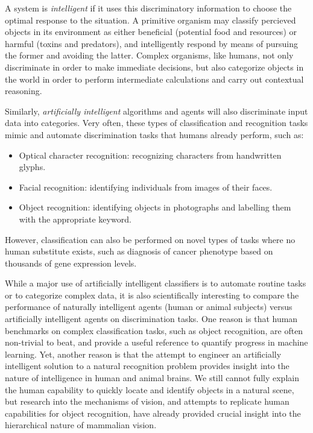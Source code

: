 A system is \emph{intelligent} if it uses this discriminatory
information to choose the optimal response to the situation.  A
primitive organism may classify percieved objects in its environment
as either beneficial (potential food and resources) or harmful (toxins
and predators), and intelligently respond by means of pursuing the
former and avoiding the latter.  Complex organisms, like humans, not
only discriminate in order to make immediate decisions, but also
categorize objects in the world in order to perform intermediate
calculations and carry out contextual reasoning.  


Similarly, \emph{artificially intelligent} algorithms and agents will
also discriminate input data into categories.  Very often, these types
of classification and recognition tasks mimic and automate
discrimination tasks that humans already perform, such as:
\begin{itemize}
\item Optical character recognition: recognizing characters from handwritten glyphs.
\item Facial recognition: identifying individuals from images of their faces.
\item Object recognition: identifying objects in photographs and labelling them with the appropriate keyword.
\end{itemize}
However, classification can also be performed on novel types of tasks
where no human substitute exists, such as diagnosis of cancer
phenotype based on thousands of gene expression levels.

While a major use of artificially intelligent classifiers is to
automate routine tasks or to categorize complex data, it is also
scientifically interesting to compare the performance of naturally
intelligent agents (human or animal subjects) versus artificially
intelligent agents on discrimination tasks.  One reason is that human
benchmarks on complex classification tasks, such as object
recognition, are often non-trivial to beat, and provide a useful
reference to quantify progress in machine learning.  Yet, another
reason is that the attempt to engineer an artificially intelligent
solution to a natural recognition problem provides insight into the
nature of intelligence in human and animal brains.  We still cannot
fully explain the human capability to quickly locate and identify
objects in a natural scene, but research into the mechanisms of
vision, and attempts to replicate human capabilities for object
recognition, have already provided crucial insight into the
hierarchical nature of mammalian vision.  %

